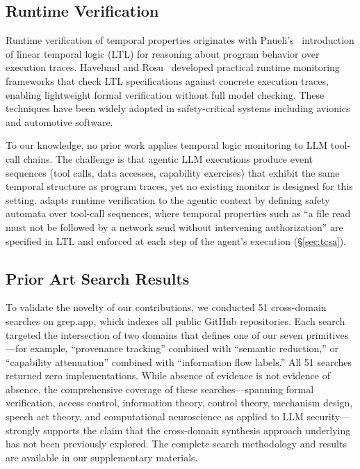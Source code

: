 \subsection{Runtime Verification}
\label{sec:related:runtime}

Runtime verification of temporal properties originates with Pnueli's~\cite{pnueli1977} introduction of linear temporal logic (LTL) for reasoning about program behavior over execution traces. Havelund and Rosu~\cite{havelund2004} developed practical runtime monitoring frameworks that check LTL specifications against concrete execution traces, enabling lightweight formal verification without full model checking. These techniques have been widely adopted in safety-critical systems including avionics and automotive software.

To our knowledge, no prior work applies temporal logic monitoring to LLM tool-call chains. The challenge is that agentic LLM executions produce event sequences (tool calls, data accesses, capability exercises) that exhibit the same temporal structure as program traces, yet no existing monitor is designed for this setting. \tsa adapts runtime verification to the agentic context by defining safety automata over tool-call sequences, where temporal properties such as ``a file read must not be followed by a network send without intervening authorization'' are specified in LTL and enforced at each step of the agent's execution (\S\ref{sec:tcsa}).

\subsection{Prior Art Search Results}
\label{sec:related:search}

To validate the novelty of our contributions, we conducted 51 cross-domain searches on grep.app, which indexes all public GitHub repositories. Each search targeted the intersection of two domains that defines one of our seven primitives---for example, ``provenance tracking'' combined with ``semantic reduction,'' or ``capability attenuation'' combined with ``information flow labels.'' All 51 searches returned zero implementations. While absence of evidence is not evidence of absence, the comprehensive coverage of these searches---spanning formal verification, access control, information theory, control theory, mechanism design, speech act theory, and computational neuroscience as applied to LLM security---strongly supports the claim that the cross-domain synthesis approach underlying \sentinel has not been previously explored. The complete search methodology and results are available in our supplementary materials.
